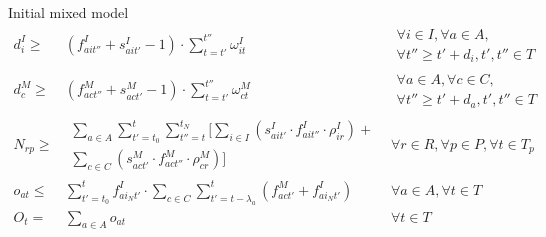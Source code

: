 \documentclass{beamer}
\begin{document}
\begin{frame}{Initial mixed model}
{\begin{align}
d^I_i \geq& (f^I_{ait''} + s^I_{ait'} - 1) \cdot \sum_{t = t'}^{t''} \omega^I_{it} 				& 	\begin{aligned} \forall i \in I, \forall a \in A, \\
																	\forall t'' \geq t' + d_i, t', t'' \in T	\end{aligned}\\
d^M_c \geq& (f^M_{act''} + s^M_{act'} - 1) \cdot \sum_{t = t'}^{t''} \omega^M_{ct} 				& 	\begin{aligned} \forall a \in A, \forall c \in C, \\
																	\forall t'' \geq t' + d_a, t', t'' \in T	\end{aligned}\\
N_{rp} \geq& \begin{aligned}\sum_{a\in A} \sum_{t' = t_0}^t \sum_{t'' = t}^{t_N} [ \sum_{i\in I} (s^I_{ait'} \cdot f^I_{ait''} \cdot \rho_{ir}^I) + \\ \sum_{c\in C} (s^M_{act'} \cdot f^M_{act''} \cdot \rho_{cr}^M) ] \end{aligned}	& 	\forall r \in R, \forall p \in P, \forall t \in T_p 	\\
o_{at} \leq& \sum_{t' = t_0}^{t} f^I_{ai_Nt'} \cdot \sum_{c \in C} \sum_{t' = t - \lambda_a}^t (f^M_{act'} + f^I_{ai_Nt'})	&	\forall a \in A, \forall t \in T \\
O_t =& \sum_{a \in A} o_{at}													&	\forall t \in T
\end{align} }

\end{frame}
\end{document}
